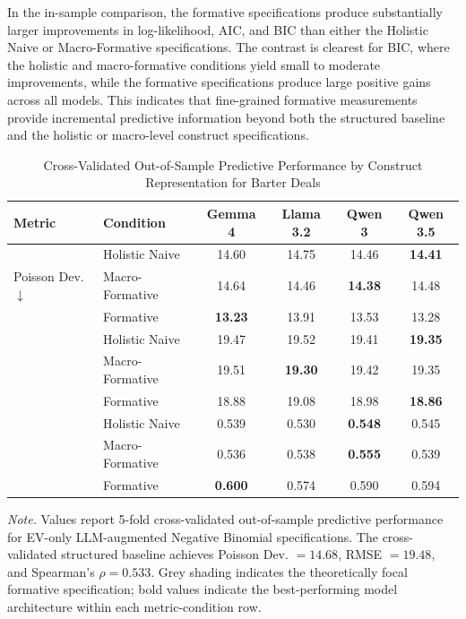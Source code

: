 In the in-sample comparison, the formative specifications produce substantially larger improvements in log-likelihood, AIC, and BIC than either the Holistic Naive or Macro-Formative specifications. The contrast is clearest for BIC, where the holistic and macro-formative conditions yield small to moderate improvements, while the formative specifications produce large positive gains across all models. This indicates that fine-grained formative measurements provide incremental predictive information beyond both the structured baseline and the holistic or macro-level construct specifications.


\begin{table}[ht]
    \centering
    \caption{Cross-Validated Out-of-Sample Predictive Performance by Construct Representation for Barter Deals}
    \label{tab:barter_cv_compact}
    \begin{tabular}{llcccc}
    \toprule
    Metric & Condition & Gemma 4 & Llama 3.2 & Qwen 3 & Qwen 3.5 \\
    \midrule
    \multirow{3}{*}{Poisson Dev. $\downarrow$} & Holistic Naive   & 14.60 & 14.75 & 14.46 & \textbf{14.41} \\
     & Macro-Formative  & 14.64 & 14.46 & \textbf{14.38} & 14.48 \\
     \rowcolor{focalrow}
     & Formative        & \textbf{13.23} & 13.91 & 13.53 & 13.28 \\
    \addlinespace[0.5em]
    \multirow{3}{*}{RMSE $\downarrow$} & Holistic Naive   & 19.47 & 19.52 & 19.41 & \textbf{19.35} \\
     & Macro-Formative  & 19.51 & \textbf{19.30} & 19.42 & 19.35 \\
     \rowcolor{focalrow}
     & Formative        & 18.88 & 19.08 & 18.98 & \textbf{18.86} \\
    \addlinespace[0.5em]
    \multirow{3}{*}{Spearman's $\rho$ $\uparrow$} & Holistic Naive   & 0.539 & 0.530 & \textbf{0.548} & 0.545 \\
     & Macro-Formative  & 0.536 & 0.538 & \textbf{0.555} & 0.539 \\
     \rowcolor{focalrow}
     & Formative        & \textbf{0.600} & 0.574 & 0.590 & 0.594 \\
    \bottomrule
    \end{tabular}
    \begin{flushleft}
    \footnotesize
    \textit{Note.} Values report 5-fold cross-validated out-of-sample predictive performance for EV-only LLM-augmented Negative Binomial specifications. The cross-validated structured baseline achieves Poisson Dev. $= 14.68$, RMSE $= 19.48$, and Spearman's $\rho = 0.533$. Grey shading indicates the theoretically focal formative specification; bold values indicate the best-performing model architecture within each metric-condition row.
    \end{flushleft}
\end{table}

